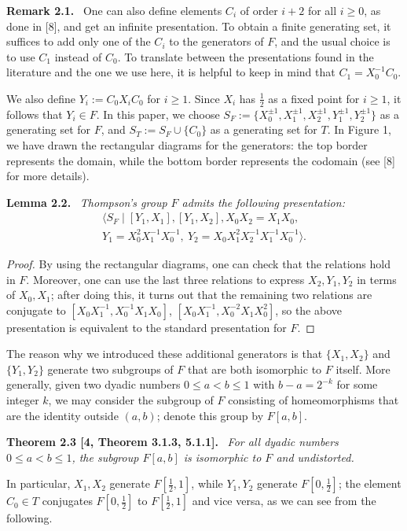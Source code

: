 \documentclass[10pt,a4paper]{article}
\newenvironment{authorstatement}[1]{\par\medskip\noindent\textbf{#1}\ \itshape}{\par\medskip}
\newenvironment{authorremark}[1]{\par\medskip\noindent\textbf{#1}\ }{\par\medskip}
\begin{document}
\begin{authorremark}{Remark 2.1.}
One can also define elements $C_i$ of order $i+2$ for all $i\ge0$, as done in [8], and get an infinite presentation. To obtain a finite generating set, it suffices to add only one of the $C_i$ to the generators of $F$, and the usual choice is to use $C_1$ instead of $C_0$. To translate between the presentations found in the literature and the one we use here, it is helpful to keep in mind that $C_1=X_0^{-1}C_0$.
\end{authorremark}
We also define $Y_i:=C_0X_iC_0$ for $i\ge1$. Since $X_i$ has $\frac12$ as a fixed point for $i\ge1$, it follows that $Y_i\in F$. In this paper, we choose $S_F:=\{X_0^{\pm1},X_1^{\pm1},X_2^{\pm1},Y_1^{\pm1},Y_2^{\pm1}\}$ as a generating set for $F$, and $S_T:=S_F\cup\{C_0\}$ as a generating set for $T$. In Figure 1, we have drawn the rectangular diagrams for the generators: the top border represents the domain, while the bottom border represents the codomain (see [8] for more details).

\begin{authorstatement}{Lemma 2.2.}
Thompson's group $F$ admits the following presentation:
\[
\begin{gathered}
\langle S_F\mid [Y_1,X_1], [Y_1,X_2], X_0X_2=X_1X_0,\\
Y_1=X_0^2X_1^{-1}X_0^{-1},\ Y_2=X_0X_1^2X_2^{-1}X_1^{-1}X_0^{-1}\rangle.
\end{gathered}
\]
\end{authorstatement}
\begin{proof}
By using the rectangular diagrams, one can check that the relations hold in $F$. Moreover, one can use the last three relations to express $X_2,Y_1,Y_2$ in terms of $X_0,X_1$; after doing this, it turns out that the remaining two relations are conjugate to $[X_0X_1^{-1},X_0^{-1}X_1X_0]$, $[X_0X_1^{-1},X_0^{-2}X_1X_0^2]$, so the above presentation is equivalent to the standard presentation for $F$.
\end{proof}
The reason why we introduced these additional generators is that $\{X_1,X_2\}$ and $\{Y_1,Y_2\}$ generate two subgroups of $F$ that are both isomorphic to $F$ itself. More generally, given two dyadic numbers $0\le a<b\le1$ with $b-a=2^{-k}$ for some integer $k$, we may consider the subgroup of $F$ consisting of homeomorphisms that are the identity outside $(a,b)$; denote this group by $F[a,b]$.

\begin{authorstatement}{Theorem 2.3 [4, Theorem 3.1.3, 5.1.1].}
For all dyadic numbers $0\le a<b\le1$, the subgroup $F[a,b]$ is isomorphic to $F$ and undistorted.
\end{authorstatement}
In particular, $X_1,X_2$ generate $F[\frac12,1]$, while $Y_1,Y_2$ generate $F[0,\frac12]$; the element $C_0\in T$ conjugates $F[0,\frac12]$ to $F[\frac12,1]$ and vice versa, as we can see from the following.
\end{document}
